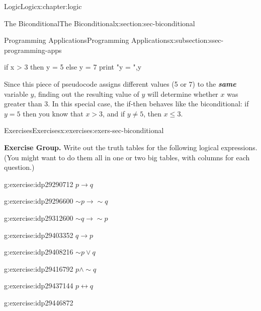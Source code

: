 \documentclass[twoside,10pt,]{book}
\newcommand{\alert}[1]{\textbf{\textit{#1}}}
\numberwithin{equation}{section}
\newcommand{\conditional}{{p {\rightarrow} q}}
\newcommand{\inverse}{{\sim\!{p}{} {\rightarrow} \sim\!{q}{}}}
\newcommand{\converse}{{q {\rightarrow} p}}
\newcommand{\contrapositive}{{\sim\!{q}{} {\rightarrow} \sim\!{p}{}}}
\newcommand{\biconditional}{{p {\leftrightarrow}{} q}}
\newcommand{\gt}{>}
\begin{document}
\begin{chapterptx}{Logic}{}{Logic}{}{}{x:chapter:logic}
\begin{sectionptx}{The Biconditional}{}{The Biconditional}{}{}{x:section:sec-biconditional}
\begin{subsectionptx}{Programming Applications}{}{Programming Applications}{}{}{x:subsection:ssec-programming-apps}
\begin{codedisplay}
              if x > 3 then
                y = 5
              else
                y = 7
              print "y = ",y
            
\end{codedisplay}
Since this piece of pseudocode assigns different values (5 or 7) to the \alert{same} variable \(y\), finding out the resulting value of \(y\) will determine whether \(x\) was greater than 3.  In this special case, the if-then behaves like the biconditional: if \(y=5\) then you know that \(x \gt 3\), and if \(y\ne 5\), then \(x\leq 3\).%
\end{subsectionptx}
%
%
\typeout{************************************************}
\typeout{************************************************}
%
\begin{exercises-subsection}{Exercises}{}{Exercises}{}{}{x:exercises:exers-sec-biconditional}
\par\medskip\noindent%
\textbf{Exercise Group.}\space\space%
Write out the truth tables for the following logical expressions.  (You might want to do them all in one or two big tables, with columns for each question.)\begin{exercisegroup}
\begin{divisionexerciseeg}{1}{}{}{g:exercise:idp29290712}%
\(\conditional\)\end{divisionexerciseeg}%
\begin{divisionexerciseeg}{2}{}{}{g:exercise:idp29296600}%
\(\inverse\)\end{divisionexerciseeg}%
\begin{divisionexerciseeg}{3}{}{}{g:exercise:idp29312600}%
\(\contrapositive\)\end{divisionexerciseeg}%
\begin{divisionexerciseeg}{4}{}{}{g:exercise:idp29403352}%
\(\converse \)\end{divisionexerciseeg}%
\begin{divisionexerciseeg}{5}{}{}{g:exercise:idp29408216}%
\(\sim\!{p}{\vee} q \)\end{divisionexerciseeg}%
\begin{divisionexerciseeg}{6}{}{}{g:exercise:idp29416792}%
\(p{\wedge}\sim\!{q} \)\end{divisionexerciseeg}%
\begin{divisionexerciseeg}{7}{}{}{g:exercise:idp29437144}%
\(\biconditional \)\end{divisionexerciseeg}%
\begin{divisionexerciseeg}{8}{}{}{g:exercise:idp29446872}%

\end{divisionexerciseeg}
\end{exercisegroup}
\end{exercises-subsection}
\end{sectionptx}
\end{chapterptx}
\end{document}
